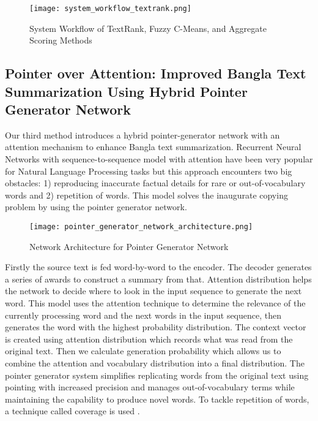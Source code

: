 \documentclass[12pt]{report}
\begin{document}
\begin{figure}[H]
    \centering
    \texttt{[image: system\_workflow\_textrank.png]}
    \caption{System Workflow of TextRank, Fuzzy C-Means, and Aggregate Scoring Methods \cite{rahman2019bengali}}
    \label{fig:textrank_fuzzycmeans_architecture}
\end{figure}

\subsection*{Pointer over Attention: Improved Bangla Text Summarization Using Hybrid Pointer Generator Network}
Our third method introduces a hybrid pointer-generator network with an attention mechanism to enhance Bangla text summarization. Recurrent Neural Networks with sequence-to-sequence model with attention have been very popular for Natural Language Processing tasks but this approach encounters two big obstacles: 1) reproducing inaccurate factual details for rare or out-of-vocabulary words and 2) repetition of words. This model solves the inaugurate copying problem by using the pointer generator network. 

\begin{figure}[H]
    \centering
    \texttt{[image: pointer\_generator\_network\_architecture.png]}
    \caption{Network Architecture for Pointer Generator Network \cite{dhar2021pointer}}
    \label{fig:pointer_generator_architecture}
\end{figure}

Firstly the source text is fed word-by-word to the encoder. The decoder generates a series of awards to construct a summary from that. Attention distribution helps the network to decide where to look in the input sequence to generate the next word. This model uses the attention technique to determine the relevance of the currently processing word and the next words in the input sequence, then generates the word with the highest probability distribution. The context vector is created using attention distribution which records what was read from the original text. Then we calculate generation probability which allows us to combine the attention and vocabulary distribution into a final distribution. The pointer generator system simplifies replicating words from the original text using pointing with increased precision and manages out-of-vocabulary terms while maintaining the capability to produce novel words. To tackle repetition of words, a technique called coverage is used \cite{dhar2021pointer}.
\end{document}

